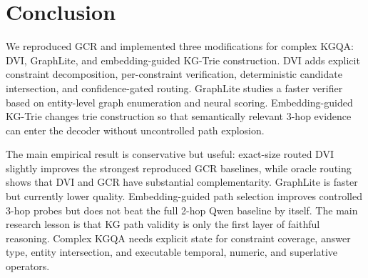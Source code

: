 \documentclass[10pt,twocolumn]{article}
\begin{document}
\clearpage
\onecolumn
\section{Conclusion}
We reproduced GCR and implemented three modifications for complex KGQA: DVI, GraphLite, and embedding-guided KG-Trie construction. DVI adds explicit constraint decomposition, per-constraint verification, deterministic candidate intersection, and confidence-gated routing. GraphLite studies a faster verifier based on entity-level graph enumeration and neural scoring. Embedding-guided KG-Trie changes trie construction so that semantically relevant 3-hop evidence can enter the decoder without uncontrolled path explosion.

The main empirical result is conservative but useful: exact-size routed DVI slightly improves the strongest reproduced GCR baselines, while oracle routing shows that DVI and GCR have substantial complementarity. GraphLite is faster but currently lower quality. Embedding-guided path selection improves controlled 3-hop probes but does not beat the full 2-hop Qwen baseline by itself. The main research lesson is that KG path validity is only the first layer of faithful reasoning. Complex KGQA needs explicit state for constraint coverage, answer type, entity intersection, and executable temporal, numeric, and superlative operators.
\end{document}
